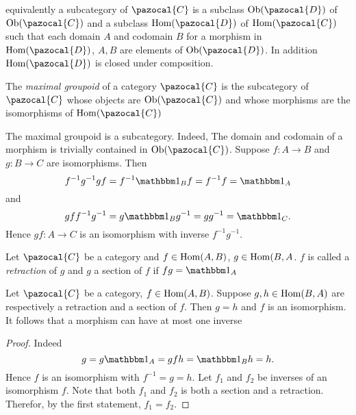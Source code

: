 \begin{remark}
    equivalently a subcategory of $\pazocal{C}$ is a subclass $\Ob(\pazocal{D})$ of $\Ob(\pazocal{C})$ and a subclass $\Hom(\pazocal{D})$ of $\Hom(\pazocal{C})$ such that each domain $A$ and codomain $B$ for a morphism in $\Hom(\pazocal{D})$, $A,B$ are elements of $\Ob(\pazocal{D})$. In addition $\Hom(\pazocal{D})$ is closed under composition. 
\end{remark}
\begin{definition}
    The \textit{maximal groupoid} of a category $\pazocal{C}$ is the subcategory of $\pazocal{C}$ whose objects are $\Ob(\pazocal{C})$ and whose morphisms are the isomorphisms of $\Hom(\pazocal{C})$
\end{definition}
\begin{remark}
    The maximal groupoid is a subcategory. Indeed, The domain and codomain of a morphism is trivially contained in $\Ob(\pazocal{C})$. Suppose $f:A\rightarrow B$ and $g: B \rightarrow C$ are isomorphisms. Then 
    $$f^{-1}g^{-1}gf=f^{-1}\fone_B f = f^{-1}f = \fone_A$$
    and 
    $$gff^{-1}g^{-1} = g\fone_B g^{-1} = gg^{-1} = \fone_C.$$
    Hence $gf: A \rightarrow C$ is an isomorphism with inverse $f^{-1}g^{-1}$. 
\end{remark}
\begin{definition}
    Let $\pazocal{C}$ be a category and $f\in \mathrm{Hom}(A,B)$, $g\in \mathrm{Hom}(B,A$.  $f$ is called a \textit{retraction} of $g$ and $g$ a section of $f$ if $fg = \fone_A$   
\end{definition}
\begin{lemma}
    Let $\pazocal{C}$ be a category, $f\in \mathrm{Hom}(A,B)$. Suppose $g,h\in \mathrm{Hom}(B,A)$ are respectively a retraction and a section of $f$. Then $g=h$ and $f$ is an isomorphism. It follows that a morphism can have at most one inverse
\end{lemma}
\begin{proof}
    Indeed 
    $$g=g\fone_A = gfh=\fone_B h = h.$$
    Hence $f$ is an isomorphism with $f^{-1} = g=h$. Let $f_1$ and $f_2$ be inverses of an isomorphism $f$. Note that both $f_1$ and $f_2$ is both a section and a retraction. Therefor, by the first statement, $f_1=f_2$.   
\end{proof}
